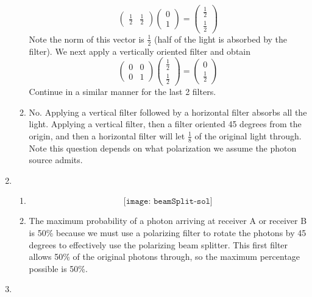 \documentclass[12pt]{article}
\begin{document}
\begin{enumerate}[font=\bfseries]
\begin{enumerate}
\[\begin{pmatrix}
                \frac{1}{2} & \frac{1}{2}
                \end{pmatrix}
                \begin{pmatrix} 0 \\ 1 \end{pmatrix}
                =
                \begin{pmatrix} \frac{1}{2} \\ \frac{1}{2} \end{pmatrix}
                \]
            Note the norm of this vector is $\frac{1}{2}$ (half of the light is absorbed by the filter). We next apply a vertically oriented filter and obtain
            \[\begin{pmatrix}
                0 & 0 \\
                0 & 1
                \end{pmatrix}
                \begin{pmatrix}
                \frac{1}{2} \\ \frac{1}{2}
                \end{pmatrix}
                =
                \begin{pmatrix} 0 \\ \frac{1}{2} \end{pmatrix}
                \]
            Continue in a similar manner for the last 2 filters.
            \item No. Applying a vertical filter followed by a horizontal filter absorbs all the light. Applying a vertical filter, then a filter oriented 45 degrees from the origin, and then a horizontal filter will let $\frac{1}{8}$ of the original light through. Note this question depends on what polarization we assume the photon source admits. 
    \end{enumerate}
    \item \begin{enumerate}
        \item \[\texttt{[image: beamSplit-sol]}\]
        \item The maximum probability of a photon arriving at receiver A or receiver B is 50\% because we must use a polarizing filter to rotate the photons by 45 degrees to effectively use the polarizing beam splitter. This first filter allows 50\% of the original photons through, so the maximum percentage possible is 50\%.
    \end{enumerate}
    \item \begin{enumerate}

\end{enumerate}
\end{enumerate}
\end{document}
